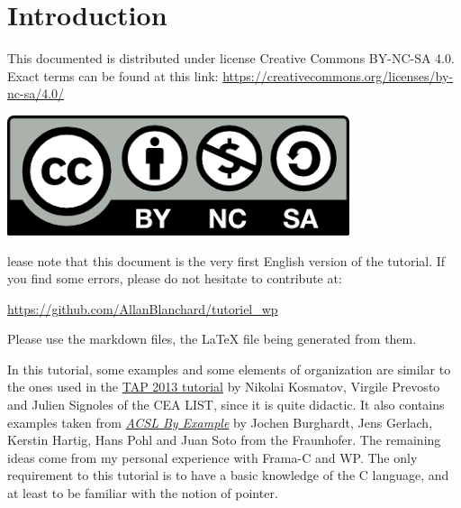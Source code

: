 \documentclass[12pt,francais,]{scrbook}
\title{\color{white}{INTRODUCTION TO C PROGRAM PROOF USING FRAMA-C AND ITS WP PLUGIN}}
\author{\color{ocre}{Allan Blanchard}}
\date{\color{white}{$ $\\December 2017}}
\newenvironment{zdsalertblock}[1]{%
  \tcolorbox[beamer,%
    noparskip,breakable,
    colback=LightCoral,colframe=DarkRed,%
    colbacklower=Tomato,%
    title=#1]
}{\endtcolorbox}
\newenvironment{zdsblock}[1]{%
  \tcolorbox[beamer,%
    noparskip,breakable,
    colback=LightBlue,colframe=DarkBlue,%
    colbacklower=DarkBlue,%
    title=#1]
}{\endtcolorbox}
\begin{document}
\maketitle
\ClearWallPaper

{
\hypersetup{linkcolor=ocre}
\setcounter{tocdepth}{2}
\tableofcontents
}
\chapter{Introduction}\label{introduction}

\begin{zdsblock}{License}
  This documented is distributed under license Creative Commons BY-NC-SA 4.0.
  Exact terms can be found at this link:
  \href{https://creativecommons.org/licenses/by-nc-sa/4.0/}
       {https://creativecommons.org/licenses/by-nc-sa/4.0/}
  \begin{center}
    \includegraphics[width=.3\textwidth]{cc-by-nc-sa.png}
  \end{center}
\end{zdsblock}

\begin{zdsalertblock}
  Please note that this document is the very first English version of the
  tutorial. If you find some errors, please do not hesitate to contribute at:

  \href{https://github.com/AllanBlanchard/tutoriel_wp}{https://github.com/AllanBlanchard/tutoriel\_wp}

  Please use the markdown files, the LaTeX file being generated from them.
\end{zdsalertblock}

\begin{zdsblock}{Information}
  In this tutorial, some examples and some elements of organization are
  similar to the ones used in the \href{http://www.spacios.eu/TAP2013/keynotes.html}{TAP 2013
    tutorial} by Nikolai Kosmatov, Virgile Prevosto and Julien
  Signoles of the CEA LIST, since it is quite didactic. It also
  contains examples taken from
  \emph{\href{http://www.fokus.fraunhofer.de/download/acsl_by_example.pdf}{ACSL By Example}}
  by Jochen Burghardt, Jens Gerlach, Kerstin Hartig, Hans Pohl and Juan
  Soto from the Fraunhofer. The remaining ideas come from my personal
  experience with Frama-C and WP. The only requirement to this tutorial
  is to have a basic knowledge of the C language, and at least to
  be familiar with the notion of pointer.
\end{zdsblock}
\end{document}
